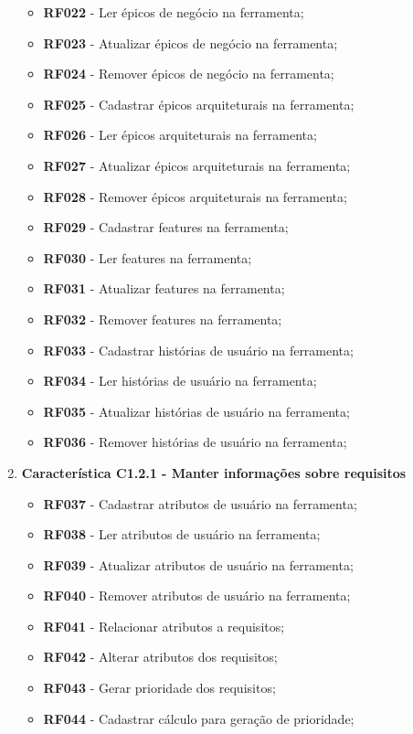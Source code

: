 \begin{enumerate}
\begin{itemize}
				\item \textbf{RF022} - Ler épicos de negócio na ferramenta;
				\item \textbf{RF023} - Atualizar épicos de negócio na ferramenta;
				\item \textbf{RF024} - Remover épicos de negócio na ferramenta;
				\item \textbf{RF025} - Cadastrar épicos arquiteturais na ferramenta;
				\item \textbf{RF026} - Ler épicos arquiteturais na ferramenta;
				\item \textbf{RF027} - Atualizar épicos arquiteturais na ferramenta;
				\item \textbf{RF028} - Remover épicos arquiteturais na ferramenta;
				\item \textbf{RF029} - Cadastrar features na ferramenta;
				\item \textbf{RF030} - Ler features na ferramenta;
				\item \textbf{RF031} - Atualizar features na ferramenta;
				\item \textbf{RF032} - Remover features na ferramenta;
				\item \textbf{RF033} - Cadastrar histórias de usuário na ferramenta;
				\item \textbf{RF034} - Ler histórias de usuário na ferramenta;
				\item \textbf{RF035} - Atualizar histórias de usuário na ferramenta;
				\item \textbf{RF036} - Remover histórias de usuário na ferramenta;
			\end{itemize}
		\item \textbf{Característica C1.2.1 - Manter informações sobre requisitos}
			\begin{itemize}
				\item \textbf{RF037} - Cadastrar atributos de usuário na ferramenta;
				\item \textbf{RF038} - Ler atributos de usuário na ferramenta;
				\item \textbf{RF039} - Atualizar atributos de usuário na ferramenta;
				\item \textbf{RF040} - Remover atributos de usuário na ferramenta;
				\item \textbf{RF041} - Relacionar atributos a requisitos;
				\item \textbf{RF042} - Alterar atributos dos requisitos;
				\item \textbf{RF043} - Gerar prioridade dos requisitos;
				\item \textbf{RF044} - Cadastrar cálculo para geração de prioridade;

\end{itemize}
\end{enumerate}
